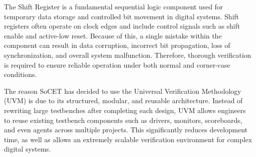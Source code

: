 The Shift Register is a fundamental sequential logic component used for temporary data storage and controlled bit movement in digital systems. Shift registers often operate on clock edges and include control signals such as shift enable and active-low reset. Because of this, a single mistake within the component can result in data corruption, incorrect bit propagation, loss of synchronization, and overall system malfunction. Therefore, thorough verification is required to ensure reliable operation under both normal and corner-case conditions.

The reason SoCET has decided to use the Universal Verification Methodology (UVM) is due to its structured, modular, and reusable architecture. Instead of rewriting large testbenches after completing each design, UVM allows engineers to reuse existing testbench components such as drivers, monitors, scoreboards, and even agents across multiple projects. This significantly reduces development time, as well as allows an extremely scalable verification environment for complex digital systems.

